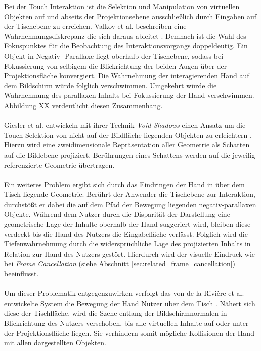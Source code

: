 Bei der Touch Interaktion ist die Selektion und Manipulation von virtuellen Objekten auf und abseits der Projektionsebene ausschließlich durch Eingaben auf der Tischebene zu erreichen. Valkov et al. beschreiben eine Wahrnehmungsdiskrepanz die sich daraus ableitet \cite{valkov:2011}. Demnach ist die Wahl des Fokuspunktes für die Beobachtung des Interaktionsvorgangs doppeldeutig. Ein Objekt in Negativ- Parallaxe liegt oberhalb der Tischebene, sodass bei Fokussierung von selbigem die Blickrichtung der beiden Augen über der Projektionsfläche konvergiert. Die Wahrnehmung der interagierenden Hand auf dem Bildschirm würde folglich verschwimmen. Umgekehrt würde die Wahrnehmung des parallaxen Inhalts bei Fokussierung der Hand verschwimmen. Abbildung XX verdeutlicht diesen Zusammenhang. 
\\\\
Giesler et al. entwickeln mit ihrer Technik \emph{Void Shadows} einen Ansatz um die Touch Selektion von nicht auf der Bildfläche liegenden Objekten zu erleichtern \cite{giesler:2014}. Hierzu wird eine zweidimensionale Repräsentation aller Geometrie als Schatten auf die Bildebene projiziert. Berührungen eines Schattens werden auf die jeweilig referenzierte Geometrie übertragen.
\\\\
Ein weiteres Problem ergibt sich durch das Eindringen der Hand in über dem Tisch liegende Geometrie. Berührt der Anwender die Tischebene zur Interaktion, durchstößt er dabei die auf dem Pfad der Bewegung liegenden negativ-parallaxen Objekte. Während dem Nutzer durch die Disparität der Darstellung eine geometrische Lage der Inhalte oberhalb der Hand suggeriert wird, bleiben diese verdeckt bis die Hand des Nutzers die Eingabefläche verlässt. Folglich wird die Tiefenwahrnehmung durch die widersprüchliche Lage des projizierten Inhalts in Relation zur Hand des Nutzers gestört. Hierdurch wird der visuelle Eindruck wie bei \emph{Frame Cancellation} (siehe Abschnitt \ref{sec:related_frame_cancellation})  beeinflusst.
\\\\
Um dieser Problematik entgegenzuwirken verfolgt das von de la Rivière et al. entwickelte System die Bewegung der Hand Nutzer über dem Tisch \cite{delariviere:2010}. Nähert sich diese der Tischfläche, wird die Szene entlang der Bildschirmnormalen in Blickrichtung des Nutzers verschoben, bis alle virtuellen Inhalte auf oder unter der Projektionsfläche liegen. Sie verhindern somit mögliche Kollisionen der Hand mit allen dargestellten Objekten.



